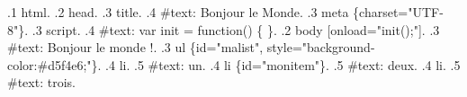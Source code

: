 \documentclass{report}
\begin{document}
\begin{multicols*}{2}
\begin{dirtree}{%
.1 html.
.2 head.
.3 title.
.4 \#text: Bonjour le Monde.
.3 meta \{charset="UTF-8"\}.
.3 script.
.4 \#text: var init = function() \{ \}.
.2 body [onload="init();"].
.3 \#text: Bonjour le monde !.
.3 ul \{id="malist", style="background-color:\#d5f4e6;"\}.
.4 li.
.5 \#text: un.
.4 li \{id="monitem"\}.
.5 \#text: deux.
.4 li.
.5 \#text: trois.
}
\end{dirtree}


\end{multicols*}
\end{document}

